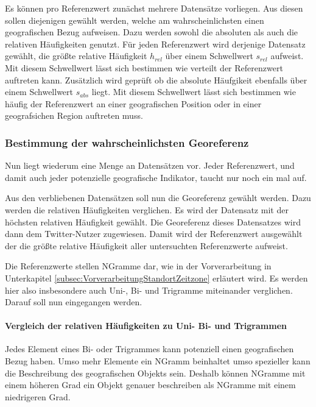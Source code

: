 				Es können pro Referenzwert zunächst mehrere Datensätze vorliegen.
				Aus diesen sollen diejenigen gewählt werden, welche am wahrscheinlichsten einen geografischen Bezug aufweisen.
				Dazu werden sowohl die absoluten als auch die relativen Häufigkeiten genutzt. 
				Für jeden Referenzwert wird derjenige Datensatz gewählt, die größte relative Häufigkeit $h_{rel}$ über einem Schwellwert $s_{rel}$ aufweist.
				Mit diesem Schwellwert lässt sich bestimmen wie verteilt der Referenzwert auftreten kann.
				Zusätzlich wird geprüft ob die absolute Häufgikeit ebenfalls über einem Schwellwert $s_{abs}$ liegt.
				Mit diesem Schwellwert lässt sich bestimmen wie häufig der Referenzwert an einer geografischen Position oder in einer geografsichen Region auftreten muss. 

			\subsubsection{Bestimmung der wahrscheinlichsten Georeferenz} 

				Nun liegt wiederum eine Menge an Datensätzen vor.
				Jeder Referenzwert, und damit auch jeder potenzielle geografische Indikator, taucht nur noch ein mal auf. 

				Aus den verbliebenen Datensätzen soll nun die Georeferenz gewählt werden. 
				Dazu werden die relativen Häufigkeiten verglichen.
				Es wird der Datensatz mit der höchsten relativen Häufigkeit gewählt.
				Die Georeferenz dieses Datensatzes wird dann dem Twitter-Nutzer zugewiesen. 
				Damit wird der Referenzwert ausgewählt der die größte relative Häufigkeit aller untersuchten Referenzwerte aufweist. 

				Die Referenzwerte stellen NGramme dar, wie in der Vorverarbeitung in Unterkapitel \ref{subsec:VorverarbeitungStandortZeitzone} erläutert wird.
				Es werden hier also insbesondere auch Uni-, Bi- und Trigramme miteinander verglichen.
				Darauf soll nun eingegangen werden.

				\paragraph{Vergleich der relativen Häufigkeiten zu Uni- Bi- und Trigrammen}

					Jedes Element eines Bi- oder Trigrammes kann potenziell einen geografischen Bezug haben. 
					Umso mehr Elemente ein NGramm beinhaltet umso spezieller kann die Beschreibung des geografischen Objekts sein.
					Deshalb können NGramme mit einem höheren Grad ein Objekt genauer beschreiben als NGramme mit einem niedrigeren Grad.

